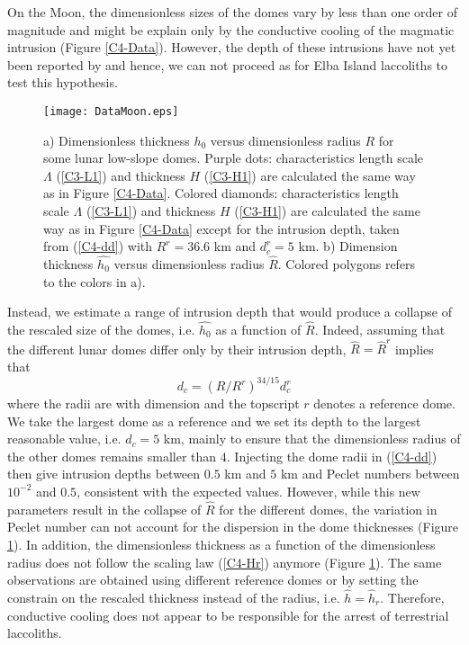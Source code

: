 On the  Moon, the dimensionless sizes  of the domes vary  by less than
one order  of magnitude and  might be  explain only by  the conductive
cooling of the magmatic intrusion (Figure \ref{C4-Data}). However, the
depth   of  these   intrusions   have  not   yet   been  reported   by
\citet{Wohler:2009jj} and hence, we can not proceed as for Elba Island
laccoliths to test this hypothesis.
\begin{figure}[h!]
  \begin{center}
    \graphicspath{ {/Users/thorey/Documents/These/Projet/Refroidissement/Skin_Model/Figure/Figure_Heating/} }
    \texttt{[image: DataMoon.eps]}
    \caption{  a) Dimensionless  thickness $h_0$  versus dimensionless
      radius  $R$  for  some  lunar  low-slope  domes.   Purple  dots:
      characteristics   length  scale   $\Lambda$  (\ref{C3-L1})   and
      thickness $H$  (\ref{C3-H1}) are calculated  the same way  as in
      Figure \ref{C4-Data}.  Colored  diamonds: characteristics length
      scale  $\Lambda$ (\ref{C3-L1})  and thickness  $H$ (\ref{C3-H1})
      are calculated  the same way  as in Figure  \ref{C4-Data} except
      for  the   intrusion  depth,   taken  from   (\ref{C4-dd})  with
      $R^r  =  36.6$ km  and  $d_c^r=5$  km.  b)  Dimension  thickness
      $\hat{h_0}$  versus  dimensionless  radius  $\hat{R}$.   Colored
      polygons refers to the colors in a).}
    \label{C4-ArrestMoon}
  \end{center}
\end{figure}
Instead, we estimate  a range of intrusion depth that  would produce a
collapse of  the rescaled size  of the  domes, i.e.  $\hat{h_0}$  as a
function  of $\hat{R}$.   Indeed,  assuming that  the different  lunar
domes  differ  only  by  their  intrusion  depth,  $\hat{R}=\hat{R}^r$
implies that
\begin{equation}
  d_c = \left(R/R^r\right)^{34/15}d_c^r
  \label{C4-dd}
\end{equation}
where the  radii are with  dimension and  the topscript $r$  denotes a
reference dome. We take the largest dome as a reference and we set its
depth to  the largest  reasonable value, i.e.   $d_c=5$ km,  mainly to
ensure  that  the dimensionless  radius  of  the other  domes  remains
smaller than $4$.  Injecting the dome radii in (\ref{C4-dd}) then give
intrusion  depths between  $0.5$  km  and $5$  km  and Peclet  numbers
between   $10^{-2}$   and   $0.5$,  consistent   with   the   expected
values. However, while  this new parameters result in  the collapse of
$\hat{R}$ for the different domes,  the variation in Peclet number can
not  account  for  the  dispersion in  the  dome  thicknesses  (Figure
\ref{C4-ArrestMoon}).  In  addition, the dimensionless thickness  as a
function of the  dimensionless radius does not follow  the scaling law
(\ref{C4-Hr})   anymore   (Figure  \ref{C4-ArrestMoon}).    The   same
observations  are  obtained  using  different reference  domes  or  by
setting the constrain on the rescaled thickness instead of the radius,
i.e.   $\hat{h}=\hat{h}_r$.  Therefore,  conductive  cooling does  not
appear to be responsible for the arrest of terrestrial laccoliths.

